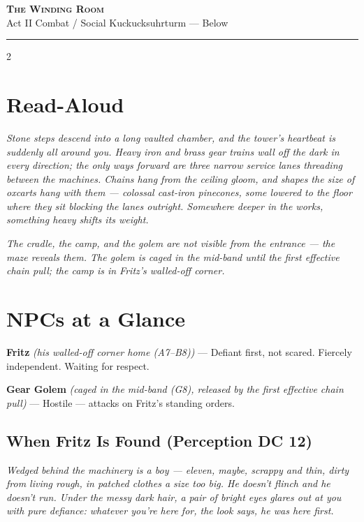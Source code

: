 \documentclass[10pt,letterpaper]{article}
\newcommand{\sceneheader}[4]{%
  \fancyhead[L]{\small\textcolor{accent}{\scshape #1}}%
  \fancyhead[R]{\small\textcolor{accent}{#2 \quad \textbullet \quad #3}}%
  \begin{center}
  {\LARGE\bfseries\scshape\textcolor{accent}{#1}}\\[2pt]
  {\small #2 \quad \textbullet \quad #3 \quad \textbullet \quad #4}\\[2pt]
  \textcolor{rulecol}{\rule{0.5\textwidth}{0.8pt}}
  \end{center}
  \vspace{-4pt}
}
\newcommand{\npc}[3]{\textbf{#1} \textit{(#2)} --- #3}
\begin{document}
\newpage


\label{sec:gearroom}\sceneheader{The Winding Room}{Act II}{Combat / Social}{Kuckucksuhrturm --- Below}

\begin{multicols}{2}

\section*{Read-Aloud}
\begin{readaloud}
\itshape
Stone steps descend into a long vaulted chamber, and the tower's heartbeat is suddenly all around you. Heavy iron and brass gear trains wall off the dark in every direction; the only ways forward are three narrow service lanes threading between the machines. Chains hang from the ceiling gloom, and shapes the size of oxcarts hang with them --- colossal cast-iron pinecones, some lowered to the floor where they sit blocking the lanes outright. Somewhere deeper in the works, something heavy shifts its weight.
\end{readaloud}

\textit{The cradle, the camp, and the golem are not visible from the entrance --- the maze reveals them. The golem is caged in the mid-band until the first effective chain pull; the camp is in Fritz's walled-off corner.}

\section*{NPCs at a Glance}

\npc{Fritz}{his walled-off corner home (A7--B8)}{Defiant first, not scared. Fiercely independent. Waiting for respect.}

\npc{Gear Golem}{caged in the mid-band (G8), released by the first effective chain pull}{Hostile --- attacks on Fritz's standing orders.}

\subsection*{When Fritz Is Found (Perception DC 12)}
\begin{readaloud}
\itshape
Wedged behind the machinery is a boy --- eleven, maybe, scrappy and thin, dirty from living rough, in patched clothes a size too big. He doesn't flinch and he doesn't run. Under the messy dark hair, a pair of bright eyes glares out at you with pure defiance: whatever you're here for, the look says, he was here first.
\end{readaloud}


\end{multicols}
\end{document}
